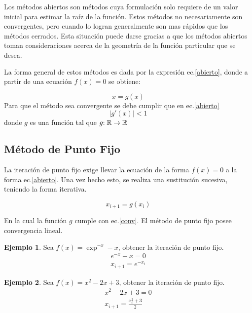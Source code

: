\documentclass[letterpaper,10pt,oneside]{sphinxmanual}
\theoremstyle{plain}%
\theoremstyle{definition}%
\newtheorem{ejemplo}{Ejemplo}[chapter]
\theoremstyle{remark}%
\newcommand{\modulo}[1]{\left | #1 \right |}
\newcommand{\f}[3]{#1 \negthickspace : #2 \to #3}
\begin{document}
\noindent Los métodos abiertos son métodos cuya formulación solo requiere de un valor inicial para estimar la raíz de la función. Estos métodos no necesariamente son convergentes, pero cuando lo logran generalmente son mas rápidos que los métodos cerrados. Esta situación puede darse gracias a que los métodos abiertos toman consideraciones acerca de la geometría de la función particular que se desea.\medskip

\noindent La forma general de estos métodos es dada por la expresión ec.\ref{abierto}, donde a partir de una ecuación $f(x)=0$ se obtiene:\medskip

\begin{equation}
 x=g(x) \label{abierto} 
\end{equation}
Para que el método sea convergente se debe cumplir que en ec.\ref{abierto} 
\begin{equation}
 \modulo{g\prime(x)}<1 \label{conv}
\end{equation}
donde $g$ es una función tal que $\f{g}{\mathbb{R}}{\mathbb{R}}$

\subsection{Método de Punto Fijo}

\noindent La iteración de punto fijo exige llevar la ecuación de la forma $f(x)=0$ a la forma ec.\ref{abierto}. Una vez hecho esto, se realiza una sustitución sucesiva, teniendo la forma iterativa.\medskip

\begin{equation}
 x_{i+1}=g(x_{i}) \label{fijo}
\end{equation}

\noindent En la cual la función $g$ cumple con ec.\ref{conv}. El método de punto fijo posee convergencia lineal.\medskip

\begin{ejemplo}
\noindent Sea $f(x)=\exp^{-x}-x$, obtener la iteración de punto fijo.
\begin{eqnarray*}
 e^{-x}-x=0 \\
x_{i+1}=e^{-x_{i}}
\end{eqnarray*}
\end{ejemplo}
\begin{ejemplo}
\noindent Sea $f(x)=x^{2}-2x+3$, obtener la iteración de punto fijo.
\begin{eqnarray*}
x^{2}-2x+3=0 \\
x_{i+1}=\frac{x_{i}^{2}+3}{2}
\end{eqnarray*}
\end{ejemplo}
\end{document}
